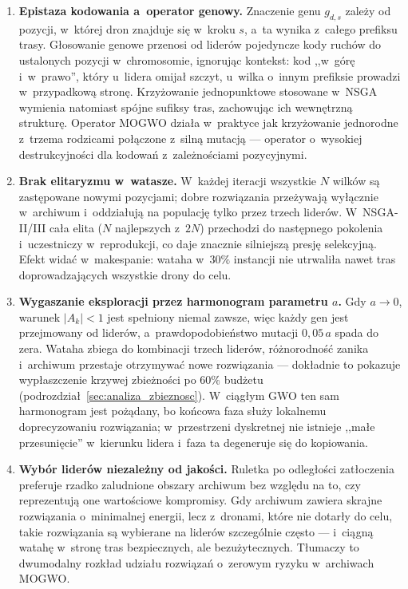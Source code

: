 \begin{enumerate}
    \item \textbf{Epistaza kodowania a~operator genowy.} Znaczenie genu $g_{d,s}$
    zależy od pozycji, w~której dron znajduje się w~kroku $s$, a~ta wynika
    z~całego prefiksu trasy. Głosowanie genowe przenosi od liderów pojedyncze
    kody ruchów do ustalonych pozycji w~chromosomie, ignorując kontekst: kod
    ,,w~górę i~w~prawo'', który u~lidera omijał szczyt, u~wilka o~innym prefiksie
    prowadzi w~przypadkową stronę. Krzyżowanie jednopunktowe stosowane w~NSGA
    wymienia natomiast spójne sufiksy tras, zachowując ich wewnętrzną strukturę.
    Operator MOGWO działa w~praktyce jak krzyżowanie jednorodne z~trzema rodzicami
    połączone z~silną mutacją --- operator o~wysokiej destrukcyjności dla kodowań
    z~zależnościami pozycyjnymi.
    \item \textbf{Brak elitaryzmu w~watasze.} W~każdej iteracji wszystkie $N$
    wilków są zastępowane nowymi pozycjami; dobre rozwiązania przeżywają
    wyłącznie w~archiwum i~oddziałują na populację tylko przez trzech liderów.
    W~NSGA-II/III cała elita ($N$ najlepszych z~$2N$) przechodzi do następnego
    pokolenia i~uczestniczy w~reprodukcji, co daje znacznie silniejszą presję
    selekcyjną. Efekt widać w~makespanie: wataha w~$30\%$ instancji nie
    utrwaliła nawet tras doprowadzających wszystkie drony do celu.
    \item \textbf{Wygaszanie eksploracji przez harmonogram parametru $a$.} Gdy
    $a \rightarrow 0$, warunek $|A_k| < 1$ jest spełniony niemal zawsze, więc
    każdy gen jest przejmowany od liderów, a~prawdopodobieństwo mutacji
    $0{,}05\,a$ spada do zera. Wataha zbiega do kombinacji trzech liderów,
    różnorodność zanika i~archiwum przestaje otrzymywać nowe rozwiązania ---
    dokładnie to pokazuje wypłaszczenie krzywej zbieżności po $60\%$ budżetu
    (podrozdział~\ref{sec:analiza_zbieznosc}). W~ciągłym GWO ten sam harmonogram
    jest pożądany, bo końcowa faza służy lokalnemu doprecyzowaniu rozwiązania;
    w~przestrzeni dyskretnej nie istnieje ,,małe przesunięcie'' w~kierunku lidera
    i~faza ta degeneruje się do kopiowania.
    \item \textbf{Wybór liderów niezależny od jakości.} Ruletka po odległości
    zatłoczenia preferuje rzadko zaludnione obszary archiwum bez względu na to,
    czy reprezentują one wartościowe kompromisy. Gdy archiwum zawiera skrajne
    rozwiązania o~minimalnej energii, lecz z~dronami, które nie dotarły do celu,
    takie rozwiązania są wybierane na liderów szczególnie często --- i~ciągną
    watahę w~stronę tras bezpiecznych, ale bezużytecznych. Tłumaczy to dwumodalny
    rozkład udziału rozwiązań o~zerowym ryzyku w~archiwach MOGWO.
\end{enumerate}

